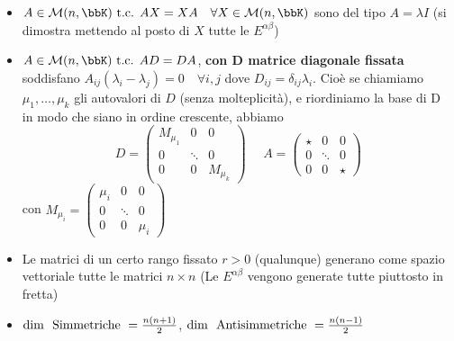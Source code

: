 \documentclass[a4paper,NoNotes,GeneralMath]{stdmdoc}
\begin{document}
\begin{itemize}
		\item $A \in \mathcal{M}(n, \bbK) \tc AX = XA \quad \forall X \in \mathcal{M}(n, \bbK)$ sono del tipo $A = \lambda I$ (si dimostra mettendo al posto di $X$ tutte le $E^{\alpha\beta}$)
		\item $A \in \mathcal{M}(n, \bbK) \tc AD = DA$, {\bf con $\bm D$ matrice diagonale fissata} soddisfano $A_{ij}(\lambda_i - \lambda_j) = 0 \quad \forall i,j$ dove $D_{ij} = \delta_{ij}\lambda_i$. Cioè se chiamiamo $\mu_1, \ldots, \mu_k$ gli autovalori di $D$ (senza molteplicità), e riordiniamo la base di D in modo che siano in ordine crescente, abbiamo $$D = \left(\begin{array}{c|c|c} M_{\mu_1} & 0 & 0 \\ \hline 0 & \ddots & 0 \\ \hline 0 & 0 & M_{\mu_k} \end{array}\right) \ \ \ \ \ \ A = \left(\begin{array}{c|c|c} \star & 0 & 0 \\ \hline 0 & \ddots & 0 \\ \hline 0 & 0 & \star \end{array}\right) $$ con $M_{\mu_i} = \left(\begin{array}{ccc} \mu_i & 0 & 0 \\ 0 & \ddots & 0 \\ 0 & 0 & \mu_i \end{array}\right)$
		\item Le matrici di un certo rango fissato $r > 0$ (qualunque) generano come spazio vettoriale tutte le matrici $n\times n$ (Le $E^{\alpha\beta}$ vengono generate tutte piuttosto in fretta)
		\item $\mbox{dim } \mbox{ Simmetriche } = \frac{n(n+1)}{2}$, $\mbox{dim } \mbox{ Antisimmetriche } = \frac{n(n-1)}{2}$
	\end{itemize}
	
\end{document}
